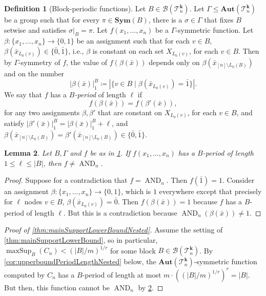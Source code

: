 \documentclass[11pt]{article}
\DeclareMathOperator{\AND}{AND}
\DeclareMathOperator{\maxSup}{maxSup}
\newcommand{\Aut}{\mathbf{Aut}}
\newcommand{\Sym}{\mathbf{Sym}}
\newcommand{\Bb}{{\mathcal B}}
\newcommand{\Tt}{{\mathcal T}}
\theoremstyle{definition}
\newtheorem{definition}{Definition}[section]
\theoremstyle{plain}
\newtheorem{lemma}[definition]{Lemma}
\theoremstyle{remark}
\theoremstyle{remark}
\begin{document}
\begin{definition}[Block-periodic functions]
	\label{def:nestedBlockPeriod}
	Let $B \in \Bb(\Tt_n^{\boldsymbol{k}})$. Let $\Gamma \leq \Aut(\Tt_n^{\boldsymbol{k}})$ be a group such that for every $\pi \in \Sym(B)$, there is a $\sigma \in \Gamma$ that fixes $B$ setwise and satisfies $\sigma|_B = \pi$.
	Let $f(x_1, \dots, x_n)$ be a $\Gamma$-symmetric function.  
	Let $\beta \colon \{x_1, \dots, x_n\} \to \{0,1\}$ be an assignment such that for each $v \in B$, $\beta(\bar{x}_{L_0(v)}) \in \{\bar{0}, \bar{1}\}$, i.e., $\beta$ is constant on each set $X_{L_0(v)}$, for each $v \in B$. 
	 Then by $\Gamma$-symmetry of $f$, the value of $f(\beta(\bar{x}))$ depends only on $\beta(\bar{x}_{[n] \setminus L_0(B)})$ and on the number 
	\[
	|\beta(\bar{x})|_{1}^B \coloneqq   |\{v \in B \mid  \beta(\bar{x}_{L_0(v)}) = \bar{1}  \}|.
	\]
	We say that $f$ has a \emph{$B$-period} of length $\ell$ if 
	\[
	f(\beta(\bar{x})) = f(\beta'(\bar{x})),
	\]
	for any two assignments $\beta, \beta'$ that are constant on $X_{L_0(v)}$, for each $v \in B$, and satisfy  $|\beta'(\bar{x})|_{1}^B = |\beta(\bar{x})|_{1}^B+\ell$, and $\beta(\bar{x}_{[n] \setminus L_0(B)}) = \beta'(\bar{x}_{[n] \setminus L_0(B)}) \in \{\bar{0}, \bar{1}\}$.  
\end{definition}	


\begin{lemma}
	\label{lem:nestedBlockPeriodNotAnd}
	Let $B, \Gamma$ and $f$ be as in \cref{def:nestedBlockPeriod}. 
	If $f(x_1, \dots, x_n)$ has a $B$-period of length $1 \leq \ell \leq |B|$, then $f \neq \AND_n$.
\end{lemma}	
\begin{proof}
	Suppose for a contradiction that $f = \AND_n$. Then $f(\bar{1}) = 1$. Consider an assignment $\beta \colon \{x_1, \dots, x_n\} \to \{0,1\}$, which is $1$ everywhere except that precisely for $\ell$ nodes $v \in B$, $\beta(\bar{x}_{L_0(v)}) = \bar{0}$. 
	Then $f(\beta(\bar{x})) = 1$ because $f$ has a $B$-period of length $\ell$. But this is a contradiction because $\AND_n(\beta(\bar{x})) \neq 1$. 
\end{proof}	

\begin{proof}[Proof of \cref{thm:mainSupportLowerBoundNested}]
	Assume the setting of \cref{thm:mainSupportLowerBound}, so in particular, $\maxSup_{B}(C_n) < (|B|/m)^{1/r}$ for some block $B \in \Bb(\Tt_n^{\boldsymbol{k}})$. 
	By \cref{cor:upperboundPeriodLengthNested} below, the $\Aut(\Tt_n^{\boldsymbol{k}})$-symmetric function computed by $C_n$ has a $B$-period of length at most $m \cdot ((|B|/m)^{1/r})^r = |B|$. But then, this function cannot be $\AND_n$ by \cref{lem:nestedBlockPeriodNotAnd}.
\end{proof}	
\end{document}
